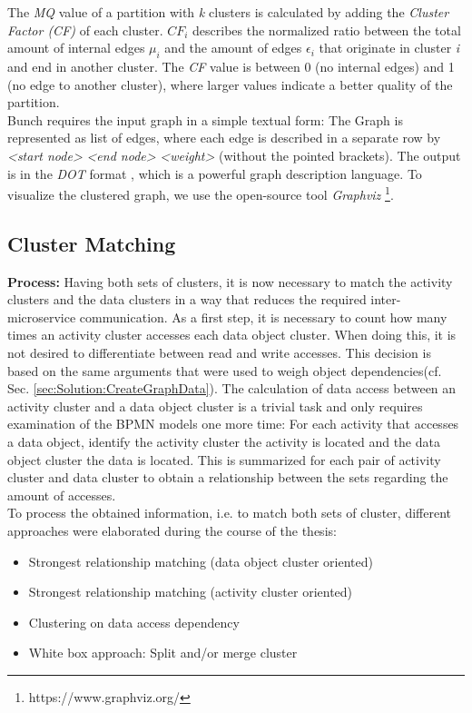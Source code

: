 \noindent
The \textit{MQ} value of a partition with \textit{k} clusters is calculated by adding the \textit{Cluster Factor (CF)} of each cluster. $CF_{i}$ describes the normalized ratio between the total amount of internal edges $\mu_{i}$ and the amount of edges $\epsilon_{i}$ that originate in cluster \textit{i} and end in another cluster. The \textit{CF} value is between 0 (no internal edges) and 1 (no edge to another cluster), where larger values indicate a better quality of the partition. \\
Bunch requires the input graph in a simple textual form: The Graph is represented as list of edges, where each edge is described in a separate row by \textit{<start node>} \textit{<end node>} \textit{<weight>} (without the pointed brackets). The output is in the \textit{DOT} format \cite{DOT}, which is a powerful graph description language. To visualize the clustered graph, we use the open-source tool \textit{Graphviz} \footnote{https://www.graphviz.org/}.




\subsection{Cluster Matching}
\label{sec:Solution:MatchCluster}
\textbf{Process:} Having both sets of clusters, it is now necessary to match the activity clusters and the data clusters in a way that reduces the required inter-microservice communication. As a first step, it is necessary to count how many times an activity cluster accesses each data object cluster. When doing this, it is not desired to differentiate between read and write accesses. This decision is based on the same arguments that were used to weigh object dependencies(cf. Sec. \ref{sec:Solution:CreateGraphData}). The calculation of data access between an activity cluster and a data object cluster is a trivial task and only requires examination of the BPMN models one more time: For each activity that accesses a data object, identify the activity cluster the activity is located and the data object cluster the data is located. This is summarized for each pair of activity cluster and data cluster to obtain a relationship between the sets regarding the amount of accesses.\\
To process the obtained information, i.e. to match both sets of cluster, different approaches were elaborated during the course of the thesis:

\begin{itemize}
	\item Strongest relationship matching (data object cluster oriented)
	\item Strongest relationship matching (activity cluster oriented)
	\item Clustering on data access dependency
	\item White box approach: Split and/or merge cluster
\end{itemize}

